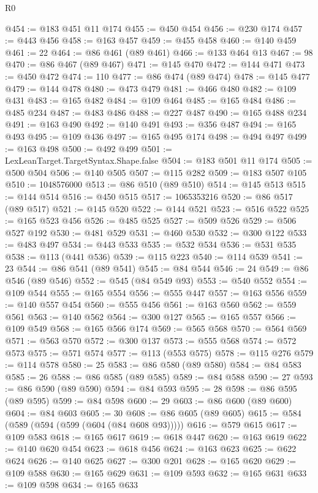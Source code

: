 \begin{lexlean}{R0}
\begin{coremodule}
@454 := @183 @451 @11 @174
@455 := @450 @454
@456 := @230 @174
@457 := @443 @456
@458 := @163 @457
@459 := @455 @458
@460 := @140 @459
@461 := 22
@464 := @86 @461 (@89 @461)
@466 := @133 @464 @13
@467 := 98
@470 := @86 @467 (@89 @467)
@471 := @145 @470
@472 := @144 @471
@473 := @450 @472
@474 := 110
@477 := @86 @474 (@89 @474)
@478 := @145 @477
@479 := @144 @478
@480 := @473 @479
@481 := @466 @480
@482 := @109 @431
@483 := @165 @482
@484 := @109 @464
@485 := @165 @484
@486 := @485 @234
@487 := @483 @486
@488 := @227 @487
@490 := @165 @488 @234
@491 := @163 @490
@492 := @140 @491
@493 := @356 @487
@494 := @165 @493
@495 := @109 @436
@497 := @165 @495 @174
@498 := @494 @497
@499 := @163 @498
@500 := @492 @499
@501 := LexLeanTarget.TargetSyntax.Shape.false
@504 := @183 @501 @11 @174
@505 := @500 @504
@506 := @140 @505
@507 := @115 @282
@509 := @183 @507 @105
@510 := 1048576000
@513 := @86 @510 (@89 @510)
@514 := @145 @513
@515 := @144 @514
@516 := @450 @515
@517 := 1065353216
@520 := @86 @517 (@89 @517)
@521 := @145 @520
@522 := @144 @521
@523 := @516 @522
@525 := @165 @523 @456
@526 := @485 @525
@527 := @509 @526
@529 := @506 @527 @192
@530 := @481 @529
@531 := @460 @530
@532 := @300 @122
@533 := @483 @497
@534 := @443 @533
@535 := @532 @534
@536 := @531 @535
@538 := @113 (@441 @536)
@539 := @115 @223
@540 := @114 @539
@541 := 23
@544 := @86 @541 (@89 @541)
@545 := @84 @544
@546 := 24
@549 := @86 @546 (@89 @546)
@552 := @545 (@84 @549 @93)
@553 := @540 @552
@554 := @109 @544
@555 := @165 @554
@556 := @555 @447
@557 := @163 @556
@559 := @140 @557 @454
@560 := @555 @456
@561 := @163 @560
@562 := @559 @561
@563 := @140 @562
@564 := @300 @127
@565 := @165 @557
@566 := @109 @549
@568 := @165 @566 @174
@569 := @565 @568
@570 := @564 @569
@571 := @563 @570
@572 := @300 @137
@573 := @555 @568
@574 := @572 @573
@575 := @571 @574
@577 := @113 (@553 @575)
@578 := @115 @276
@579 := @114 @578
@580 := 25
@583 := @86 @580 (@89 @580)
@584 := @84 @583
@585 := 26
@588 := @86 @585 (@89 @585)
@589 := @84 @588
@590 := 27
@593 := @86 @590 (@89 @590)
@594 := @84 @593
@595 := 28
@598 := @86 @595 (@89 @595)
@599 := @84 @598
@600 := 29
@603 := @86 @600 (@89 @600)
@604 := @84 @603
@605 := 30
@608 := @86 @605 (@89 @605)
@615 := @584 (@589 (@594 (@599 (@604 (@84 @608 @93)))))
@616 := @579 @615
@617 := @109 @583
@618 := @165 @617
@619 := @618 @447
@620 := @163 @619
@622 := @140 @620 @454
@623 := @618 @456
@624 := @163 @623
@625 := @622 @624
@626 := @140 @625
@627 := @300 @201
@628 := @165 @620
@629 := @109 @588
@630 := @165 @629
@631 := @109 @593
@632 := @165 @631
@633 := @109 @598
@634 := @165 @633

\end{coremodule}
\end{lexlean}
